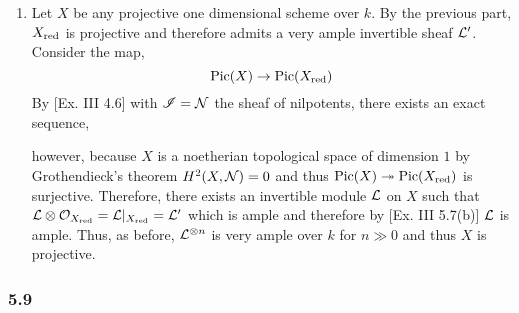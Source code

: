 \documentclass[12pt]{article}
\begin{document}
\begin{enumerate}
\item Let $X$ be any projective one dimensional scheme over $k$. By the previous part, $X_{\mathrm{red}}$ is projective and therefore admits a very ample invertible sheaf $\mathcal{L}'$. Consider the map,
\[ \mathrm{Pic}(X) \to \mathrm{Pic}(X_{\mathrm{red}}) \]
By [Ex. III 4.6] with $\mathscr{I} = \mathcal{N}$ the sheaf of nilpotents, there exists an exact sequence,
\begin{center}
\end{center}
however, because $X$ is a noetherian topological space of dimension $1$ by Grothendieck's theorem $H^2(X, \mathcal{N}) = 0$ and thus $\mathrm{Pic}(X) \twoheadrightarrow \mathrm{Pic}(X_{\mathrm{red}})$ is surjective. Therefore, there exists an invertible module $\mathcal{L}$ on $X$ such that $\mathcal{L} \otimes \mathcal{O}_{X_{\mathrm{red}}} = \mathcal{L}|_{X_{\mathrm{red}}} = \mathcal{L}'$ which is ample and therefore by [Ex. III 5.7(b)] $\mathcal{L}$ is ample. Thus, as before, $\mathcal{L}^{\otimes n}$ is very ample over $k$ for $n \gg 0$ and thus $X$ is projective.
\end{enumerate}

\subsubsection{5.9}
\end{document}
